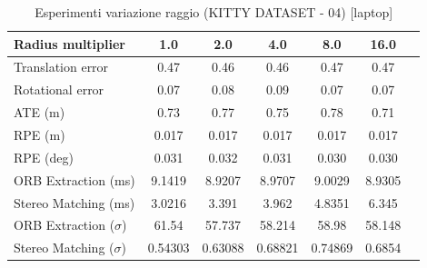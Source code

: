 \documentclass[12pt,a4paper]{report}
\begin{document}
\begin{table}[h]
    \centering
    \caption{Esperimenti variazione raggio (KITTY DATASET - 04) [laptop] }
    \begin{tabular}{lcccccc}
        \toprule
        \rowcolor{gray!20}
        Radius multiplier & 1.0 & \cellcolor{orange!40}2.0 & 4.0 & 8.0 & 16.0 \\
        \midrule
        Translation error & 0.47 & \cellcolor{green!20}0.46 & \cellcolor{green!20}0.46 & 0.47 & 0.47 \\
        Rotational error  & \cellcolor{green!20}0.07 & 0.08 & 0.09 & \cellcolor{green!20}0.07 & \cellcolor{green!20}0.07 \\
        ATE (m)           & 0.73 & 0.77 & 0.75 & 0.78 & \cellcolor{green!20}0.71 \\
        RPE (m)           & \cellcolor{green!20}0.017 & \cellcolor{green!20}0.017 & \cellcolor{green!20}0.017 & \cellcolor{green!20}0.017 & \cellcolor{green!20}0.017 \\
        RPE (deg)         & 0.031 & 0.032 & 0.031 & \cellcolor{green!20}0.030 & \cellcolor{green!20}0.030 \\
        ORB Extraction (ms) & 9.1419 & \cellcolor{green!20}8.9207 & \cellcolor{green!20}8.9707 & 9.0029 & 8.9305 \\
        Stereo Matching (ms) & \cellcolor{green!20}3.0216 & 3.391 & 3.962 & 4.8351 & 6.345 \\
        ORB Extraction ($\sigma$) & 61.54 & \cellcolor{green!20}57.737 & 58.214 & 58.98 & 58.148 \\
        Stereo Matching ($\sigma$) & \cellcolor{green!20}0.54303 & 0.63088 & 0.68821 & 0.74869 & 0.6854 \\
        \bottomrule
    \end{tabular}
\end{table}
\end{document}
